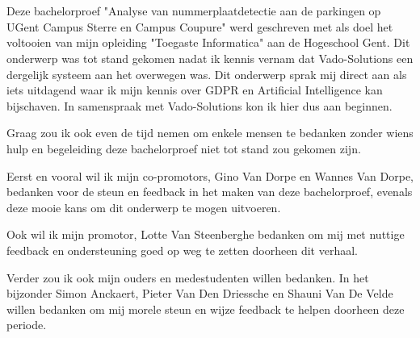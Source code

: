 
\chapter*{}
\label{ch:voorwoord}


Deze bachelorproef "Analyse van nummerplaatdetectie aan de parkingen op UGent Campus Sterre en Campus Coupure" werd geschreven met als doel het voltooien van mijn opleiding "Toegaste Informatica" aan de Hogeschool Gent. Dit onderwerp was tot stand gekomen nadat ik kennis vernam dat Vado-Solutions een dergelijk systeem aan het overwegen was. Dit onderwerp sprak mij direct aan als iets uitdagend waar ik mijn kennis over GDPR en Artificial Intelligence kan bijschaven. In samenspraak met Vado-Solutions kon ik hier dus aan beginnen.

Graag zou ik ook even de tijd nemen om enkele mensen te bedanken zonder wiens hulp en begeleiding deze bachelorproef niet tot stand zou gekomen zijn.

Eerst en vooral wil ik mijn co-promotors, Gino Van Dorpe en Wannes Van Dorpe, bedanken voor de steun en feedback in het maken van deze bachelorproef, evenals deze mooie kans om dit onderwerp te mogen uitvoeren.

Ook wil ik mijn promotor, Lotte Van Steenberghe bedanken om mij met nuttige feedback en ondersteuning goed op weg te zetten doorheen dit verhaal.

Verder zou ik ook mijn ouders en medestudenten willen bedanken. In het bijzonder Simon Anckaert, Pieter Van Den Driessche en Shauni Van De Velde willen bedanken om mij morele steun en wijze feedback te helpen doorheen deze periode.